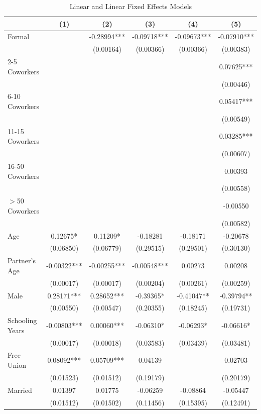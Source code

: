 \documentclass{svjour3}                     %
\begin{document}
\begin{table}[H] 
\begin{threeparttable}
\caption{Linear and Linear Fixed Effects Models}
\label{table:femodels}
\centering 
\tiny
\begin{tabular}{lccccc} \hline \hline
 & (1) & (2) & (3) & (4) & (5) \\ \hline
Formal &  & -0.28994*** & -0.09718*** & -0.09673*** & -0.07910*** \\
 &  & (0.00164) & (0.00366) & (0.00366) & (0.00383) \\
2-5 Coworkers &  &  &  &  & 0.07625*** \\
 &  &  &  &  & (0.00446) \\
6-10 Coworkers &  &  &  &  & 0.05417*** \\
 &  &  &  &  & (0.00549) \\
11-15 Coworkers &  &  &  &  & 0.03285*** \\
 &  &  &  &  & (0.00607) \\
16-50 Coworkers &  &  &  &  & 0.00393 \\
 &  &  &  &  & (0.00558) \\
$>$50 Coworkers &  &  &  &  & -0.00550 \\
 &  &  &  &  & (0.00582) \\
Age & 0.12675* & 0.11209* & -0.18281 & -0.18171 & -0.20678 \\
 & (0.06850) & (0.06779) & (0.29515) & (0.29501) & (0.30130) \\
Partner's Age & -0.00322*** & -0.00255*** & -0.00548*** & 0.00273 & 0.00208 \\
 & (0.00017) & (0.00017) & (0.00204) & (0.00261) & (0.00259) \\
Male & 0.28171*** & 0.28652*** & -0.39365* & -0.41047** & -0.39794** \\
 & (0.00550) & (0.00547) & (0.20355) & (0.18245) & (0.19731) \\
Schooling Years & -0.00803*** & 0.00060*** & -0.06310* & -0.06293* & -0.06616* \\
 & (0.00017) & (0.00018) & (0.03583) & (0.03439) & (0.03481) \\
Free Union & 0.08092*** & 0.05709*** & 0.04139 &  & 0.02703 \\
 & (0.01523) & (0.01512) & (0.19179) &  & (0.20179) \\
Married & 0.01397 & 0.01775 & -0.06259 & -0.08864 & -0.05447 \\
 & (0.01512) & (0.01502) & (0.11456) & (0.15395) & (0.12491) \\

\end{tabular}
\end{threeparttable}
\end{table}
\end{document}
